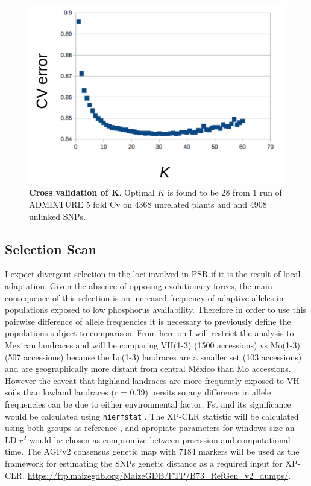 \documentclass[10pt,letterpaper]{article}
\begin{document}
\begin{figure}[!h]
   \includegraphics[width=\textwidth]{CV.png}
   \caption{\textbf{Cross validation of $\mathbf{K}$}. Optimal $K$ is found to be 28 from 1 run of ADMIXTURE 5 fold Cv on 4368 unrelated plants and and 4908 unlinked SNPs.}
  \label{figCV} 
\end{figure} 

\subsection*{Selection Scan}

I expect divergent selection in the loci involved in PSR if it is the result of local adaptation. Given the absence of opposing evolutionary forces, the main consequence of this selection is an increased frequency of adaptive alleles in populations exposed to low phosphorus availability. Therefore in order to use this pairwise difference of allele frequencies it is necessary to previously define the populations subject to comparison. From here on I will restrict the analysis to Mexican landraces and will be comparing VH(1-3) (1500 accessions) vs Mo(1-3) (507 accessions) because the Lo(1-3) landraces are a smaller set (103 accessions) and are geographically more distant from central México than Mo accessions. However the caveat that highland landraces are more frequently exposed to VH soils than lowland landraces (r = 0.39) persits so any difference in allele frequencies can be due to either environmental factor. Fst and its significance would be calculated using \texttt{hierfstat} \cite{demeeus2007}. The XP-CLR statistic will be calculated using both groups as reference \cite{chen2010}, and apropiate parameters for windows size an LD $r^2$ would be chosen as compromize between precission and computational time. The AGPv2 consensus genetic map with 7184 markers will be used as the framework for estimating the SNPs genetic distance as a required input for XP-CLR.  \url{https://ftp.maizegdb.org/MaizeGDB/FTP/B73_RefGen_v2_dumps/}.
\end{document}
